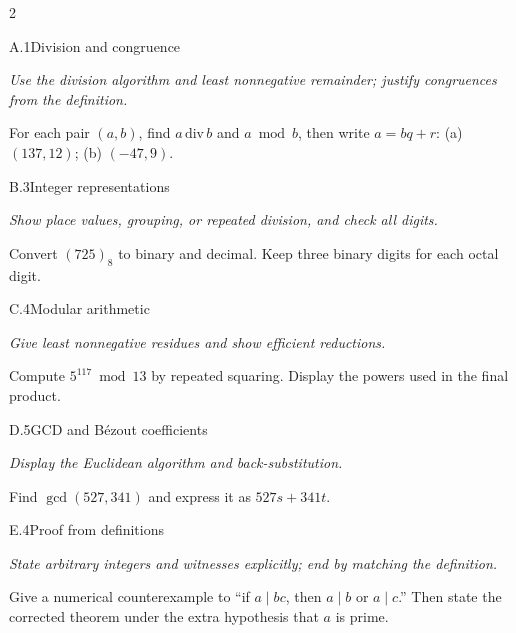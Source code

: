 \documentclass[9pt]{extarticle}
\begin{document}
\begin{multicols}{2}
\begin{CoreProblem}{A.1}{Division and congruence}
{\scriptsize\textit{Use the division algorithm and least nonnegative remainder; justify congruences from the definition.}\par}
For each pair $(a,b)$, find $a\,\mathrm{div}\,b$ and $a\bmod b$, then write
$a=bq+r$: (a) $(137,12)$; (b) $(-47,9)$.
\end{CoreProblem}
\begin{CoreProblem}{B.3}{Integer representations}
{\scriptsize\textit{Show place values, grouping, or repeated division, and check all digits.}\par}
Convert $(725)_8$ to binary and decimal. Keep three binary digits for each
octal digit.
\end{CoreProblem}
\begin{CoreProblem}{C.4}{Modular arithmetic}
{\scriptsize\textit{Give least nonnegative residues and show efficient reductions.}\par}
Compute $5^{117}\bmod13$ by repeated squaring. Display the powers used in the
final product.
\end{CoreProblem}
\columnbreak
\begin{CoreProblem}{D.5}{GCD and B\'ezout coefficients}
{\scriptsize\textit{Display the Euclidean algorithm and back-substitution.}\par}
Find $\gcd(527,341)$ and express it as $527s+341t$.
\end{CoreProblem}
\begin{CoreProblem}{E.4}{Proof from definitions}
{\scriptsize\textit{State arbitrary integers and witnesses explicitly; end by matching the definition.}\par}
Give a numerical counterexample to ``if $a\mid bc$, then $a\mid b$ or
$a\mid c$.'' Then state the corrected theorem under the extra hypothesis that
$a$ is prime.
\end{CoreProblem}
\end{multicols}
\CoreWorkArea
\FormBreak
{}
\end{document}
